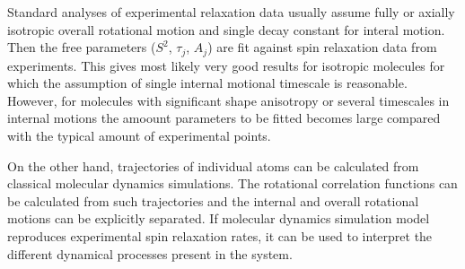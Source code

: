 \documentclass[pre,aps,floatfix,authordate1-4]{revtex4-1}
\begin{document}
Standard analyses of experimental relaxation data usually assume
fully or axially isotropic overall rotational motion and single
decay constant for interal motion. Then the free parameters
($S^2$, $\tau_j$, $A_j$) are fit against spin relaxation data
from experiments. This gives most likely very good results for
isotropic molecules for which the assumption of single internal
motional timescale is reasonable. However, for molecules with
significant shape anisotropy or several timescales in internal
motions the amoount parameters to be fitted becomes large compared
with the typical amount of experimental points.

On the other hand, trajectories of individual atoms can be calculated
from classical molecular dynamics simulations. The rotational
correlation functions can be calculated from such trajectories and
the internal and overall rotational motions can be explicitly
separated. If molecular dynamics simulation model reproduces
experimental spin relaxation rates, it can be used to interpret
the different dynamical processes present in the system.
\end{document}
